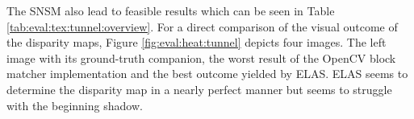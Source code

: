 \begin{table}[h!]
\centering
{}
\caption[Result table for tunnel scene]{Result table for tunnel scene of Cambridge dataset}
\label{tab:eval:tex:tunnel:overview}
\end{table}

\noindent The SNSM also lead to feasible results which can be seen in Table \ref{tab:eval:tex:tunnel:overview}.
\newline\newline\noindent For a direct comparison of the visual outcome of the disparity maps, Figure \ref{fig:eval:heat:tunnel} depicts four images.
The left image with its ground-truth companion, the worst result of the OpenCV block matcher implementation and the best outcome yielded by ELAS.
ELAS seems to determine the disparity map in a nearly perfect manner but seems to struggle with the beginning shadow.

